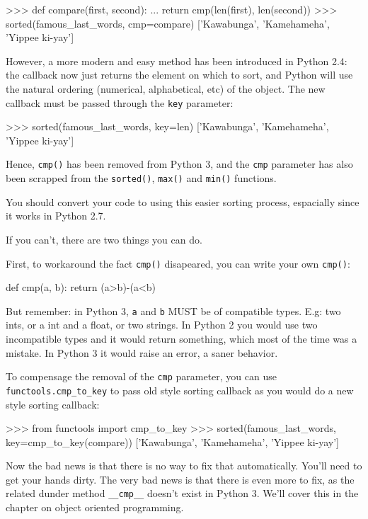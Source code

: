 \begin{py2}
>>> def compare(first, second):
...     return cmp(len(first), len(second))
>>> sorted(famous_last_words, cmp=compare)
['Kawabunga', 'Kamehameha', 'Yippee ki-yay']
\end{py2}

However, a more modern and easy method has been introduced in Python 2.4: the callback now just returns the element on which to sort, and Python will use the natural ordering (numerical, alphabetical, etc) of the object. The new callback must be passed through the \lstinline{key} parameter:

\begin{py2and3}
>>> sorted(famous_last_words, key=len)
['Kawabunga', 'Kamehameha', 'Yippee ki-yay']
\end{py2and3}

Hence, \lstinline{cmp()} has been removed from Python 3, and the \lstinline{cmp} parameter has also been scrapped from the \lstinline{sorted()}, \lstinline{max()} and \lstinline{min()} functions.

You should convert your code to using this easier sorting process, espacially since it works in Python 2.7.

If you can't, there are two things you can do.

First, to workaround the fact \lstinline{cmp()} disapeared, you can write your own \lstinline{cmp()}:

\begin{py2and3}
def cmp(a, b):
    return (a>b)-(a<b)
\end{py2and3}

But remember: in Python 3, \lstinline{a} and \lstinline{b} MUST be of compatible types. E.g: two ints, or a int and a float, or two strings. In Python 2 you would use two incompatible types and it would return something, which most of the time was a mistake. In Python 3 it would raise an error, a saner behavior.

To compensage the removal of the \lstinline{cmp} parameter, you can use \lstinline{functools.cmp_to_key} to pass old style sorting callback as you would do a new style sorting callback:

\begin{py2and3}
>>> from functools import cmp_to_key
>>> sorted(famous_last_words, key=cmp_to_key(compare))
['Kawabunga', 'Kamehameha', 'Yippee ki-yay']
\end{py2and3}

Now the bad news is that there is no way to fix that automatically. You'll need to get your hands dirty. The very bad news is that there is even more to fix, as the related \gls{dunder} method \lstinline{__cmp__} doesn't exist in Python 3. We'll cover this in the chapter on object oriented programming.

